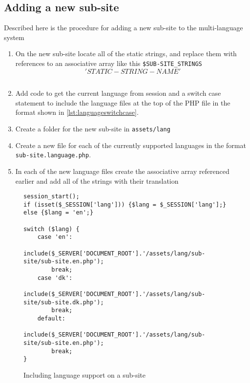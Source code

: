 \subsection{Adding a new sub-site}
Described here is the procedure for adding a new sub-site to the multi-language system
\begin{enumerate}
\item On the new sub-site locate all of the static strings, and replace them with references to an associative array like this \texttt{\$SUB-SITE\_STRINGS\['STATIC-STRING-NAME'\] }
\item Add code to get the current language from session and a switch case statement to include the language files at the top of the PHP file in the format shown in \autoref{lst:languageswitchcase}.
\item Create a folder for the new sub-site in \texttt{assets/lang}
\item Create a new file for each of the currently supported languages in the format \texttt{sub-site.language.php}.
\item In each of the new language files create the associative array referenced earlier and add all of the strings with their translation
\end{enumerate}
\begin{figure}[htbp]
\begin{lstlisting}
session_start();
if (isset($_SESSION['lang'])) {$lang = $_SESSION['lang'];} else {$lang = 'en';}

switch ($lang) {
	case 'en':
		include($_SERVER['DOCUMENT_ROOT'].'/assets/lang/sub-site/sub-site.en.php');
		break;
	case 'dk':
		include($_SERVER['DOCUMENT_ROOT'].'/assets/lang/sub-site/sub-site.dk.php');
		break;
	default:
		include($_SERVER['DOCUMENT_ROOT'].'/assets/lang/sub-site/sub-site.en.php');
		break;
}
\end{lstlisting}
\caption{Including language support on a sub-site}
\label{lst:qrcode}
\end{figure}